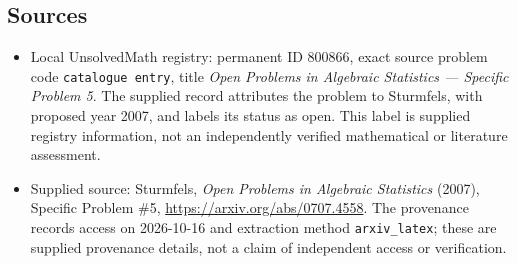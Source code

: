 \documentclass[11pt]{article}
\begin{document}
\subsection{Sources}
\begin{itemize}
\item Local UnsolvedMath registry: permanent ID \(800866\), exact source problem code \texttt{catalogue entry}, title \emph{Open Problems in Algebraic Statistics --- Specific Problem 5}. The supplied record attributes the problem to Sturmfels, with proposed year 2007, and labels its status as open. This label is supplied registry information, not an independently verified mathematical or literature assessment.
\item Supplied source: Sturmfels, \emph{Open Problems in Algebraic Statistics} (2007), Specific Problem \#5, \url{https://arxiv.org/abs/0707.4558}. The provenance records access on 2026-10-16 and extraction method \texttt{arxiv\_latex}; these are supplied provenance details, not a claim of independent access or verification.
\end{itemize}
\end{document}
